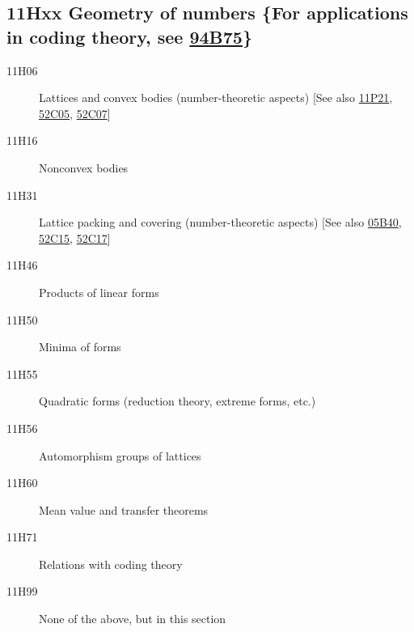 \documentclass[letterpaper]{article}
\begin{document}
\subsection*{11Hxx  Geometry of numbers \{For applications in coding theory, see \hyperref[94B75]{94B75}\} }\label{11Hxx}
\begin{description}  
\item [11H06]\label{11H06} Lattices and convex bodies (number-theoretic aspects) [See also \hyperref[11P21]{11P21}, \hyperref[52C05]{52C05}, \hyperref[52C07]{52C07}]
\item [11H16]\label{11H16} Nonconvex bodies
\item [11H31]\label{11H31} Lattice packing and covering (number-theoretic aspects) [See also \hyperref[05B40]{05B40}, \hyperref[52C15]{52C15}, \hyperref[52C17]{52C17}]
\item [11H46]\label{11H46} Products of linear forms
\item [11H50]\label{11H50} Minima of forms
\item [11H55]\label{11H55} Quadratic forms (reduction theory, extreme forms, etc.)
\item [11H56]\label{11H56} Automorphism groups of lattices
\item [11H60]\label{11H60} Mean value and transfer theorems
\item [11H71]\label{11H71} Relations with coding theory
\item [11H99]\label{11H99} None of the above, but in this section
\end{description}
\end{document}
